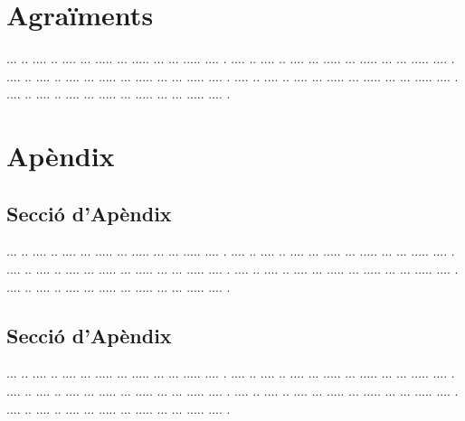 ﻿\documentclass[10pt,a4paper,twocolumn,twoside]{article}
\begin{document}
\section*{Agraïments}

... ..  .... .. .... ... ..... ... ..... ... ... ..... .... .
.... ..  .... .. .... ... ..... ... ..... ... ... ..... .... .
.... ..  .... .. .... ... ..... ... ..... ... ... ..... .... .
.... ..  .... .. .... ... ..... ... ..... ... ... ..... .... .
.... ..  .... .. .... ... ..... ... ..... ... ... ..... .... .






\appendix

\section*{Apèndix}

\setcounter{section}{1}

\subsection{Secció d'Apèndix}


... ..  .... .. .... ... ..... ... ..... ... ... ..... .... .
.... ..  .... .. .... ... ..... ... ..... ... ... ..... .... .
.... ..  .... .. .... ... ..... ... ..... ... ... ..... .... .
.... ..  .... .. .... ... ..... ... ..... ... ... ..... .... .
.... ..  .... .. .... ... ..... ... ..... ... ... ..... .... .

\subsection{Secció d'Apèndix}


... ..  .... .. .... ... ..... ... ..... ... ... ..... .... .
.... ..  .... .. .... ... ..... ... ..... ... ... ..... .... .
.... ..  .... .. .... ... ..... ... ..... ... ... ..... .... .
.... ..  .... .. .... ... ..... ... ..... ... ... ..... .... .
.... ..  .... .. .... ... ..... ... ..... ... ... ..... .... .
\end{document}
